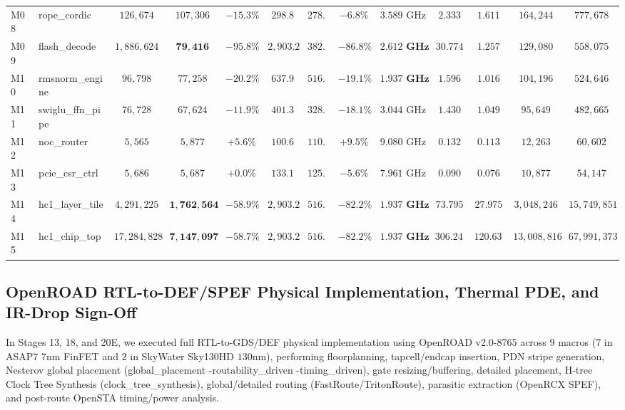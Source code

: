 \documentclass[10pt,journal,compsoc]{IEEEtran}
\def\texttt#1{#1}%
\begin{document}
\begin{table}[!t]
{\begin{tabular}{llccccccccccc}
\texttt{M08} & \texttt{rope\_cordic} & $126,674$ & $107,306$ & $-15.3\%$ & $298.8$ & $278.6$ & $-6.8\%$ & $3.589\text{ GHz}$ & $2.333$ & $1.611$ & $164,244$ & $777,678$ \\
\texttt{M09} & \texttt{flash\_decode} & $1,886,624$ & $\mathbf{79,416}$ & $\mathbf{-95.8\%}$ & $2,903.2$ & $\mathbf{382.9}$ & $\mathbf{-86.8\%}$ & $\mathbf{2.612\text{ GHz}}$ & $30.774$ & $\mathbf{1.257}$ & $129,080$ & $558,075$ \\
\texttt{M10} & \texttt{rmsnorm\_engine} & $96,798$ & $77,258$ & $-20.2\%$ & $637.9$ & $\mathbf{516.2}$ & $\mathbf{-19.1\%}$ & $\mathbf{1.937\text{ GHz}}$ & $1.596$ & $1.016$ & $104,196$ & $524,646$ \\
\texttt{M11} & \texttt{swiglu\_ffn\_pipe} & $76,728$ & $67,624$ & $-11.9\%$ & $401.3$ & $328.6$ & $-18.1\%$ & $3.044\text{ GHz}$ & $1.430$ & $1.049$ & $95,649$ & $482,665$ \\
\texttt{M12} & \texttt{noc\_router} & $5,565$ & $5,877$ & $+5.6\%$ & $100.6$ & $110.1$ & $+9.5\%$ & $9.080\text{ GHz}$ & $0.132$ & $0.113$ & $12,263$ & $60,602$ \\
\texttt{M13} & \texttt{pcie\_csr\_ctrl} & $5,686$ & $5,687$ & $+0.0\%$ & $133.1$ & $125.6$ & $-5.6\%$ & $7.961\text{ GHz}$ & $0.090$ & $0.076$ & $10,877$ & $54,147$ \\
\texttt{M14} & \texttt{hc1\_layer\_tile} & $4,291,225$ & $\mathbf{1,762,564}$ & $\mathbf{-58.9\%}$ & $2,903.2$ & $\mathbf{516.2}$ & $\mathbf{-82.2\%}$ & $\mathbf{1.937\text{ GHz}}$ & $73.795$ & $\mathbf{27.975}$ & $3,048,246$ & $15,749,851$ \\
\texttt{M15} & \texttt{hc1\_chip\_top} & $17,284,828$ & $\mathbf{7,147,097}$ & $\mathbf{-58.7\%}$ & $2,903.2$ & $\mathbf{516.2}$ & $\mathbf{-82.2\%}$ & $\mathbf{1.937\text{ GHz}}$ & $306.244$ & $\mathbf{120.630}$ & $13,008,816$ & $67,991,373$ \\
\bottomrule
\end{tabular}}
\end{table}

\subsection{OpenROAD RTL-to-DEF/SPEF Physical Implementation, Thermal PDE, and IR-Drop Sign-Off}
In Stages 13, 18, and 20E, we executed full RTL-to-GDS/DEF physical implementation using \texttt{OpenROAD v2.0-8765} \cite{ajayi2019openroad} across $9$ macros ($7$ in ASAP7 $7\text{nm}$ FinFET and $2$ in SkyWater Sky130HD $130\text{nm}$), performing floorplanning, tapcell/endcap insertion, PDN stripe generation, Nesterov global placement (\texttt{global\_placement -routability\_driven -timing\_driven}), gate resizing/buffering, detailed placement, H-tree Clock Tree Synthesis (\texttt{clock\_tree\_synthesis}), global/detailed routing (\texttt{FastRoute}/\texttt{TritonRoute}), parasitic extraction (\texttt{OpenRCX} \texttt{SPEF}), and post-route \texttt{OpenSTA} timing/power analysis.
\end{document}
